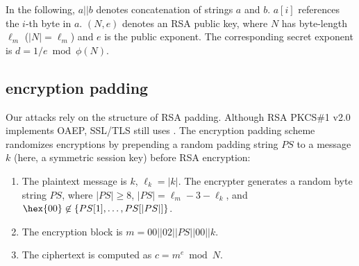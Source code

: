 %

In the following, $a||b$ denotes concatenation of strings $a$ and
$b$. $a{[i]}$ references the $i$-th byte in $a$.
$(N,e)$ denotes an RSA public key, where $N$ has byte-length
$\ell_m$ ($|N|=\ell_m$) and $e$ is the public exponent. The corresponding
secret exponent is $d = 1/e \bmod \phi(N)$.

\subsection{\PKCS encryption padding}
\label{sec:PKCSdescr}

Our attacks rely on the structure of RSA \PKCS padding.  Although RSA PKCS\#1 v2.0
implements OAEP, SSL/TLS still uses \PKCS.
The \PKCS encryption padding scheme~\cite{rfc2313}
randomizes encryptions by prepending a random padding string $PS$
to a message $k$ (here, a symmetric session key) before
RSA encryption:

\begin{enumerate} 
	\item The plaintext message is $k$, $\ell_k = |k|$. The encrypter generates a random byte
	string $PS$, where $|PS| \geq 8$, $|PS|=\ell_m-3-\ell_k$, and $\hex{00} \not \in \{PS{[1]}, \ldots,PS{[|PS|]}\}$. 
	\item The encryption block is $m = 00||02||PS||00||k$. 
	\item The ciphertext is computed as $c = m^e \bmod N$. 
\end{enumerate} 

